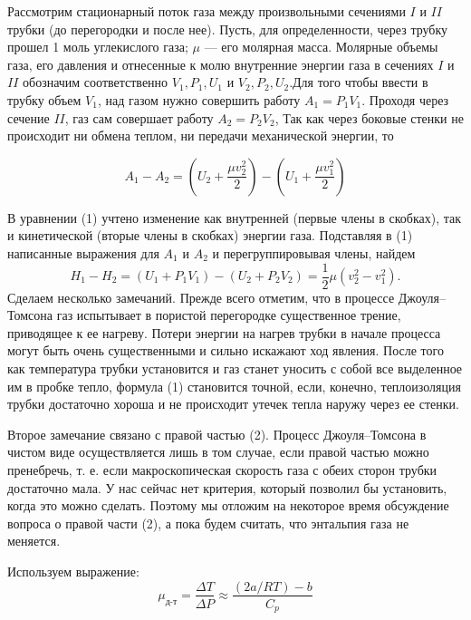 \documentclass[a4paper, 12pt]{article}
\begin{document}
\indent Рассмотрим стационарный поток газа между произвольными сечениями $I$ и $II$ трубки (до перегородки
и после нее). Пусть, для определенности, через трубку прошел 1 моль углекислого газа; $\mu$ — его
молярная масса. Молярные объемы газа, его давления и отнесенные
к молю внутренние энергии газа в сечениях $I$ и $II$ обозначим соответственно $V_{1}, P_{1}, U_{1}$ и $V_{2}, P_{2}, U_{2}$.Для того чтобы ввести в трубку объем $V_{1}$, над газом нужно совершить работу $A_{1} = P_{1}V_{1}$. Проходя через сечение $II$, газ сам совершает работу $A_{2} = P_{2}V_{2}$, Так как через боковые стенки не происходит ни обмена теплом, ни передачи механической энергии, то

\begin{equation}
	A_{1} - A_{2} = \left(U_{2} + \frac{\mu v_{2}^2}{2}\right) - \left(U_{1} + \frac{\mu v_{1}^2}{2}\right)
\end{equation}

В уравнении (1) учтено изменение как внутренней (первые члены в
скобках), так и кинетической (вторые члены в скобках) энергии газа.
Подставляя в (1) написанные выражения для $A_{1}$ и $A_{2}$ и перегруппировывая члены, найдем
\begin{equation}
	H_{1} - H_{2} = \left(U_{1} + P_{1}V_{1}\right) - \left(U_{2} + P_{2}V_{2}\right) = \frac{1}{2}\mu \left(v_{2}^2 - v_{1}^2 \right).
\end{equation}
\indent Сделаем несколько замечаний. Прежде всего отметим, что в процессе Джоуля–Томсона газ испытывает в пористой перегородке существенное трение, приводящее к ее нагреву. Потери энергии на нагрев трубки в начале процесса могут быть очень существенными и сильно искажают ход явления. После того как температура трубки
установится и газ станет уносить с собой все выделенное им в пробке тепло, формула (1) становится точной, если, конечно, теплоизоляция трубки достаточно хороша и не происходит утечек тепла наружу через ее стенки.

\indent Второе замечание связано с правой частью (2). Процесс Джоуля–Томсона в чистом виде осуществляется лишь в том случае, если правой частью можно пренебречь, т. е. если макроскопическая
скорость газа с обеих сторон трубки достаточно мала. У нас сейчас
нет критерия, который позволил бы установить, когда это можно сделать. Поэтому мы отложим на некоторое время обсуждение вопроса
о правой части (2), а пока будем считать, что энтальпия газа не меняется.

\indent Используем выражение:
\begin{equation}
	\mu_{\text{д-т}} = \frac{\Delta T}{\Delta P} \approx \frac{\left(2a/RT \right) - b}{C_{p}}
\end{equation}
\end{document}
